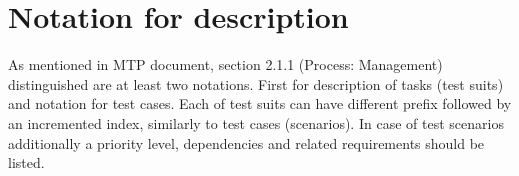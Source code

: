 \section{Notation for description} \label{s:introduction:notation-for-description}
	\begin{comment}
		Define any numbering schemes, e.g., for scenarios and test cases. The intent of this section is to
		explain any such schema.
	\end{comment}
	As mentioned in \gls{MTP} document, section 2.1.1 (Process: Management) distinguished are at least two notations. First for description of tasks (test suits) and notation for test cases. Each of test suits can have different prefix followed by an incremented index, similarly to test cases (scenarios). In case of test scenarios additionally a priority level, dependencies and related requirements should be listed.
	